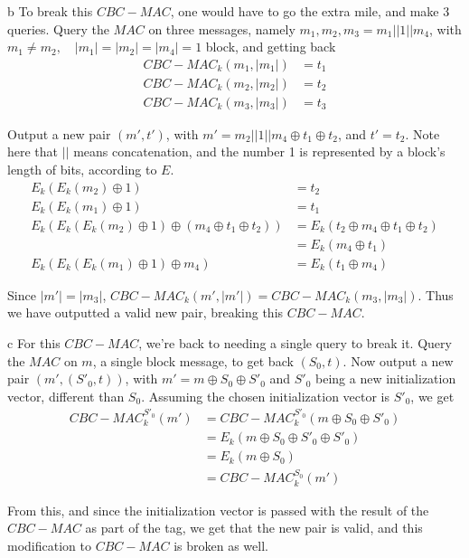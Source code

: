 \documentclass{article}
\begin{document}
\begin{paragraph}
    b To break this $CBC-MAC$, one would have to go the extra mile, and make 3 queries. Query the $MAC$ on three messages, namely $m_1, m_2, m_3 = m_1 || 1 || m_4$, with $m_1 \neq m_2, \quad |m_1| = |m_2| = |m_4| = 1$ block, and getting back
    \begin{align*}
        CBC-MAC_k(m_1, |m_1|) &= t_1\\
        CBC-MAC_k(m_2, |m_2|) &= t_2\\
        CBC-MAC_k(m_3, |m_3|) &= t_3
    \end{align*}
    
    Output a new pair $(m', t')$, with $m' = m_2 || 1 || m_4 \oplus t_1 \oplus t_2$, and $t' = t_2$. Note here that $||$ means concatenation, and the number 1 is represented by a block's length of bits, according to $E$.
    \begin{align*}
        E_k(E_k(m_2) \oplus 1) &= t_2\\
        E_k(E_k(m_1) \oplus 1) &= t_1\\
        E_k(E_k(E_k(m_2) \oplus 1) \oplus (m_4 \oplus t_1 \oplus t_2)) &= E_k(t_2 \oplus m_4 \oplus t_1 \oplus t_2)\\
        &= E_k(m_4 \oplus t_1)\\
        E_k(E_k(E_k(m_1) \oplus 1) \oplus m_4) &= E_k(t_1 \oplus m_4)
    \end{align*}
    
    Since $|m'| = |m_3|$, $CBC-MAC_k(m', |m'|) = CBC-MAC_k(m_3, |m_3|)$. Thus we have outputted a valid new pair, breaking this $CBC-MAC$.
\end{paragraph}

\begin{paragraph}
    c For this $CBC-MAC$, we're back to needing a single query to break it. Query the $MAC$ on $m$, a single block message, to get back $(S_0, t)$. Now output a new pair $(m', (S'_0, t))$, with $m' = m \oplus S_0 \oplus S'_0$ and $S'_0$ being a new initialization vector, different than $S_0$. Assuming the chosen initialization vector is $S'_0$, we get
    \begin{align*}
        CBC-MAC_k^{S'_0}(m') &= CBC-MAC_k^{S'_0}(m \oplus S_0 \oplus S'_0)\\
        &= E_k(m \oplus S_0 \oplus S'_0 \oplus S'_0)\\
        &= E_k(m \oplus S_0)\\
        &= CBC-MAC_k^{S_0}(m')
    \end{align*}
    
    From this, and since the initialization vector is passed with the result of the $CBC-MAC$ as part of the tag, we get that the new pair is valid, and this modification to $CBC-MAC$ is broken as well.
\end{paragraph}
\end{document}
